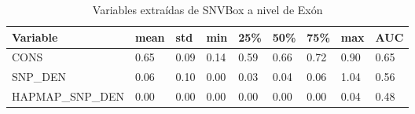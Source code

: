\begin{table}[H]
\centering
\begin{tabular}{|l|l|l|l|l|l|l|l|l|}
\hline
Variable         & mean & std  & min  & 25\% & 50\% & 75\% & max & AUC  \\ \hline
CONS             & 0.65 & 0.09 & 0.14 & 0.59 & 0.66 & 0.72 & 0.90 & 0.65 \\ \hline
SNP\_DEN         & 0.06 & 0.10 & 0.00 & 0.03 & 0.04 & 0.06 & 1.04 & 0.56 \\ \hline
HAPMAP\_SNP\_DEN & 0.00 & 0.00 & 0.00 & 0.00 & 0.00 & 0.00 & 0.04 & 0.48 \\ \hline
\end{tabular}
\caption{Variables extraídas de SNVBox a nivel de Exón}
\label{snvbox_vars}
\end{table}




